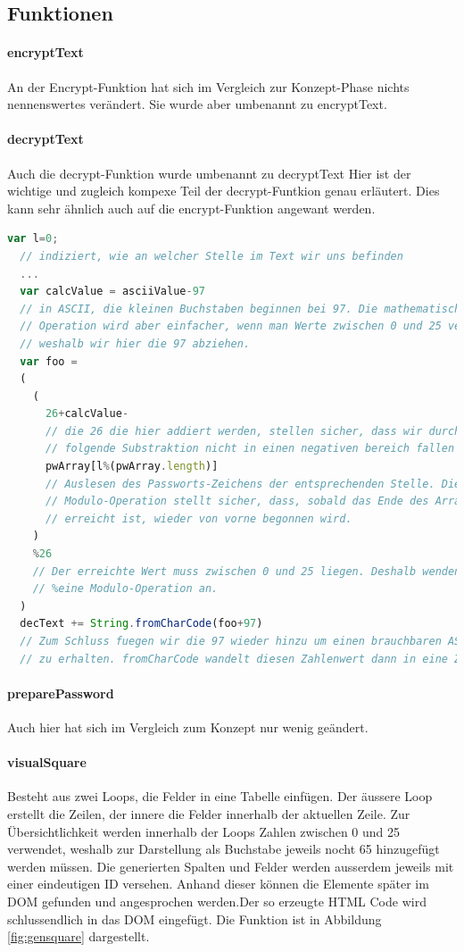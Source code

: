\documentclass[11pt,paper=a4,final]{scrartcl}
\begin{document}
\subsection{Funktionen}
\paragraph{encryptText}
An der Encrypt-Funktion hat sich im Vergleich zur Konzept-Phase nichts
nennenswertes ver\"andert. Sie wurde aber umbenannt zu encryptText.
\paragraph{decryptText}
Auch die decrypt-Funktion wurde umbenannt zu decryptText
Hier ist der wichtige und zugleich kompexe Teil der decrypt-Funtkion genau
erl\"autert. Dies kann sehr \"ahnlich auch auf die encrypt-Funktion angewant
werden.
\begin{lstlisting}[frame=single,language=JavaScript]
  var l=0;
  // indiziert, wie an welcher Stelle im Text wir uns befinden
  ...
  var calcValue = asciiValue-97
  // in ASCII, die kleinen Buchstaben beginnen bei 97. Die mathematische
  // Operation wird aber einfacher, wenn man Werte zwischen 0 und 25 verwendet
  // weshalb wir hier die 97 abziehen.
  var foo =
  (
    (
      26+calcValue-
      // die 26 die hier addiert werden, stellen sicher, dass wir durch die
      // folgende Substraktion nicht in einen negativen bereich fallen
      pwArray[l%(pwArray.length)]
      // Auslesen des Passworts-Zeichens der entsprechenden Stelle. Die
      // Modulo-Operation stellt sicher, dass, sobald das Ende des Arrays
      // erreicht ist, wieder von vorne begonnen wird.
    )
    %26
    // Der erreichte Wert muss zwischen 0 und 25 liegen. Deshalb wenden wir erneut
    // %eine Modulo-Operation an.
  )
  decText += String.fromCharCode(foo+97)
  // Zum Schluss fuegen wir die 97 wieder hinzu um einen brauchbaren ASCII Wert
  // zu erhalten. fromCharCode wandelt diesen Zahlenwert dann in eine Zahl um.
\end{lstlisting}
\paragraph{preparePassword}
Auch hier hat sich im Vergleich zum Konzept nur wenig ge\"andert.
\paragraph{visualSquare}
Besteht aus zwei Loops, die Felder in eine Tabelle einf\"ugen. Der \"aussere
Loop erstellt die Zeilen, der innere die Felder innerhalb der aktuellen Zeile.
Zur \"Ubersichtlichkeit werden innerhalb der Loops Zahlen zwischen 0 und 25
verwendet, weshalb zur Darstellung als Buchstabe jeweils nocht 65 hinzugef\"ugt
werden m\"ussen. Die generierten Spalten und Felder werden ausserdem jeweils mit
einer eindeutigen ID versehen. Anhand dieser k\"onnen die Elemente sp\"ater im
DOM gefunden und angesprochen werden.Der so erzeugte HTML Code wird
schlussendlich in das DOM eingef\"ugt. Die Funktion ist in Abbildung
\ref{fig:gensquare} \glqq {}\grqq dargestellt.
\end{document}
